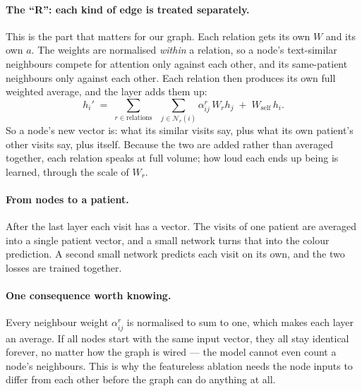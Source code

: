 \documentclass[11pt]{article}
\begin{document}
\paragraph{The ``R'': each kind of edge is treated separately.} This is the part that matters
for our graph. Each relation gets its own $W$ and its own $a$. The weights are normalised
\emph{within} a relation, so a node's text-similar neighbours compete for attention only
against each other, and its same-patient neighbours only against each other. Each relation then
produces its own full weighted average, and the layer adds them up:
\[
  h_i' \;=\; \sum_{r \in \text{relations}} \;\; \sum_{j \in \mathcal{N}_r(i)} \alpha^{r}_{ij}\, W_r h_j
  \;+\; W_{\text{self}}\, h_i .
\]
So a node's new vector is: what its similar visits say, plus what its own patient's other
visits say, plus itself. Because the two are added rather than averaged together, each relation
speaks at full volume; how loud each ends up being is learned, through the scale of $W_r$.

\paragraph{From nodes to a patient.} After the last layer each visit has a vector. The visits of
one patient are averaged into a single patient vector, and a small network turns that into the
colour prediction. A second small network predicts each visit on its own, and the two losses are
trained together.

\paragraph{One consequence worth knowing.} Every neighbour weight $\alpha^{r}_{ij}$ is
normalised to sum to one, which makes each layer an average. If all nodes start with the same
input vector, they all stay identical forever, no matter how the graph is wired --- the model
cannot even count a node's neighbours. This is why the featureless ablation needs the node
inputs to differ from each other before the graph can do anything at all.
\end{document}
